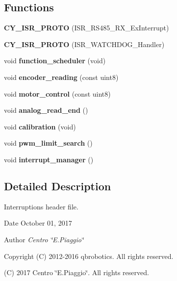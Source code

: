 \subsection*{Functions}
\begin{DoxyCompactItemize}
\item 
\mbox{\label{interruptions_8h_a7e24af8c83537b0441877bf0f00dd30a}} 
{\bfseries C\+Y\+\_\+\+I\+S\+R\+\_\+\+P\+R\+O\+TO} (I\+S\+R\+\_\+\+R\+S485\+\_\+\+R\+X\+\_\+\+Ex\+Interrupt)
\item 
\mbox{\label{interruptions_8h_a212cae8995d67d612c236fb54a4d29dc}} 
{\bfseries C\+Y\+\_\+\+I\+S\+R\+\_\+\+P\+R\+O\+TO} (I\+S\+R\+\_\+\+W\+A\+T\+C\+H\+D\+O\+G\+\_\+\+Handler)
\item 
\mbox{\label{interruptions_8h_a39df971c4e9f194be50c54dfd7aeabfe}} 
void {\bfseries function\+\_\+scheduler} (void)
\item 
\mbox{\label{interruptions_8h_a835503c311a7e6087a5add0eb2e8892b}} 
void {\bfseries encoder\+\_\+reading} (const uint8)
\item 
\mbox{\label{interruptions_8h_a94830a771fd71aa5b49ce0b08207985b}} 
void {\bfseries motor\+\_\+control} (const uint8)
\item 
\mbox{\label{interruptions_8h_a00a8d34962a63161405e5d7785b9625e}} 
void {\bfseries analog\+\_\+read\+\_\+end} ()
\item 
\mbox{\label{interruptions_8h_a0b6a0b24c6bd8af032a6778166201f7e}} 
void {\bfseries calibration} (void)
\item 
\mbox{\label{interruptions_8h_ab7b287cf5df2ea548297b951be2f20d4}} 
void {\bfseries pwm\+\_\+limit\+\_\+search} ()
\item 
\mbox{\label{interruptions_8h_a9790811526002d99b25a814afd02cbae}} 
void {\bfseries interrupt\+\_\+manager} ()
\end{DoxyCompactItemize}


\subsection{Detailed Description}
Interruptions header file. 

\begin{DoxyDate}{Date}
October 01, 2017 
\end{DoxyDate}
\begin{DoxyAuthor}{Author}
{\itshape Centro \char`\"{}\+E.\+Piaggio\char`\"{}} 
\end{DoxyAuthor}
\begin{DoxyCopyright}{Copyright}
(C) 2012-\/2016 qbrobotics. All rights reserved. 

(C) 2017 Centro \char`\"{}\+E.\+Piaggio\char`\"{}. All rights reserved. 
\end{DoxyCopyright}
